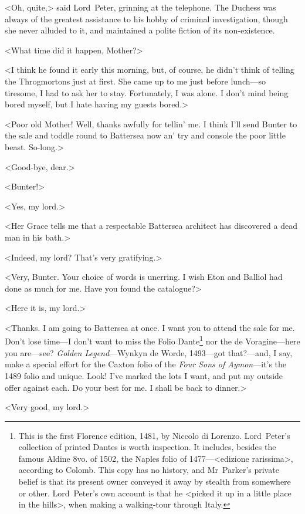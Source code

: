 <Oh, quite,> said Lord~Peter, grinning at the telephone. The Duchess was always of the greatest assistance to his hobby of criminal investigation, though she never alluded to it, and maintained a polite fiction of its non-existence.

<What time did it happen, Mother?>

<I think he found it early this morning, but, of course, he didn't think of telling the Throgmortons just at first. She came up to me just before lunch—so tiresome, I had to ask her to stay. Fortunately, I was alone. I don't mind being bored myself, but I hate having my guests bored.>

<Poor old Mother! Well, thanks awfully for tellin' me. I think I'll send Bunter to the sale and toddle round to Battersea now an' try and console the poor little beast. So-long.>

<Good-bye, dear.>

<Bunter!>

<Yes, my lord.>

<Her Grace tells me that a respectable Battersea architect has discovered a dead man in his bath.>

<Indeed, my lord? That's very gratifying.>

<Very, Bunter. Your choice of words is unerring. I wish Eton and Balliol had done as much for me. Have you found the catalogue?>

<Here it is, my lord.>

<Thanks. I am going to Battersea at once. I want you to attend the sale for me. Don't lose time—I don't want to miss the Folio Dante\footnote{This is the first Florence edition, 1481, by Niccolo di Lorenzo. Lord~Peter's collection of printed Dantes is worth inspection. It includes, besides the famous Aldine 8vo. of 1502, the Naples folio of 1477—<edizione rarissima>, according to Colomb. This copy has no history, and Mr~Parker's private belief is that its present owner conveyed it away by stealth from somewhere or other. Lord~Peter's own account is that he <picked it up in a little place in the hills>, when making a walking-tour through Italy.} nor the de Voragine—here you are—see? \textit{Golden Legend}—Wynkyn de Worde, 1493—got that?—and, I say, make a special effort for the Caxton folio of the \textit{Four Sons of Aymon}—it's the 1489 folio and unique. Look! I've marked the lots I want, and put my outside offer against each. Do your best for me. I shall be back to dinner.>

<Very good, my lord.>

